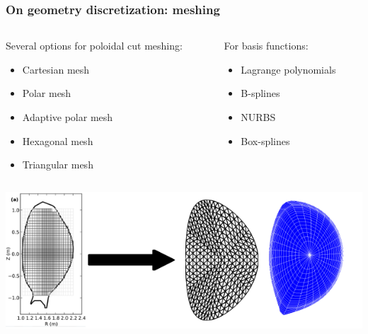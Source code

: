 \documentclass[10pt]{beamer}
\begin{document}
\begin{frame}
\frametitle{On geometry discretization: meshing}


\begin{columns}
\begin{column}{0.6\textwidth}
Several options for poloidal cut meshing:

\begin{itemize}
	\item Cartesian mesh
	\item Polar mesh
	\item Adaptive polar mesh
	\item Hexagonal mesh
	\item Triangular mesh
\end{itemize}

\end{column}
\begin{column}{0.4\textwidth}

For basis functions:

\begin{itemize}
	\item Lagrange polynomials
	\item B-splines
	\item NURBS
	\item Box-splines
\end{itemize}
\end{column}
\end{columns}



\begin{center}
    	\includegraphics[width=0.85\linewidth]{figures/meshes.png}
\end{center}
\vspace{-0.5cm}
\end{frame}
\end{document}
